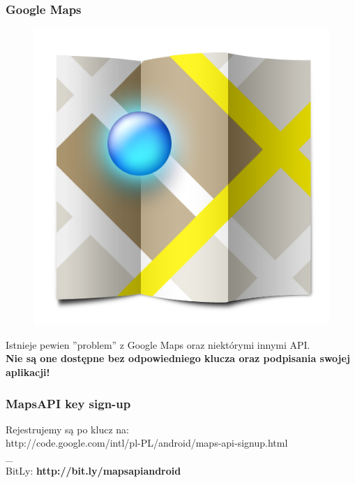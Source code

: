 \documentclass{beamer}
\begin{document}
\begin{frame}
\frametitle{Google Maps}

\begin{figure}[tc]
  \centering
  \includegraphics[height=0.45\textheight,keepaspectratio=true]{images/maps_icon}
\end{figure}

Istnieje pewien ''problem'' z Google Maps oraz niektórymi innymi API. \\
\textbf{Nie są one dostępne bez odpowiedniego klucza oraz podpisania swojej aplikacji!}
\end{frame}

\begin{frame}
 \frametitle{MapsAPI key sign-up}
  \centering Rejestrujemy są po klucz na: \\
  \centering http://code.google.com/intl/pl-PL/android/maps-api-signup.html \\
  _\\
  \centering BitLy: \textbf{http://bit.ly/mapsapiandroid}\\
\end{frame}
\end{document}
